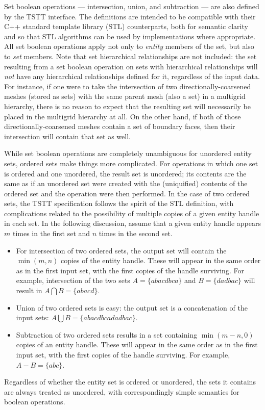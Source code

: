 Set boolean operations --- intersection, union, and subtraction ---
are also defined by the TSTT interface. The definitions are intended
to be compatible with their C++ standard template library (STL) counterparts,
both for semantic clarity and so that STL algorithms can be used by
implementations where appropriate. All set boolean operations apply
not only to \emph{entity} members of the set, but also to \emph{set}
members. Note that set hierarchical relationships are not included:
the set resulting from a set boolean operation on sets with hierarchical
relationships will \emph{not} have any hierarchical relationships
defined for it, regardless of the input data. For instance, if one
were to take the intersection of two directionally-coarsened meshes
(stored as sets) with the same parent mesh (also a set) in a multigrid
hierarchy, there is no reason to expect that the resulting set will
necessarily be placed in the multigrid hierarchy at all. On the other
hand, if both of those directionally-coarsened meshes contain a set
of boundary faces, then their intersection will contain that set as
well.

While set boolean operations are completely unambiguous for unordered
entity sets, ordered sets make things more complicated. For operations
in which one set is ordered and one unordered, the result set is unordered;
its contents are the same as if an unordered set were created with
the (uniquified) contents of the ordered set and the operation were
then performed. In the case of two ordered sets, the TSTT specification
follows the spirit of the STL definition, with complications related
to the possibility of multiple copies of a given entity handle in
each set. In the following discussion, assume that a given entity
handle appears $m$ times in the first set and $n$ times in the second
set. 

\begin{itemize}
\item For intersection of two ordered sets, the output set will contain
the $\min\left(m,n\right)$ copies of the entity handle. These will
appear in the same order as in the first input set, with the first
copies of the handle surviving. For example, intersection of the two
sets $A=\textrm{\{$abacdbca$\}}$ and $B=\{ dadbac\}$ will result
in $A\bigcap B=\{ abacd\}$.
\item Union of two ordered sets is easy: the output set is a concatenation
of the input sets: $A\bigcup B=\{ abacdbcadadbac\}$.
\item Subtraction of two ordered sets results in a set containing $\min\left(m-n,0\right)$
copies of an entity handle. These will appear in the same order as
in the first input set, with the first copies of the handle surviving.
For example, $A-B=\{ abc\}$.
\end{itemize}
Regardless of whether the entity set is ordered or unordered, the
sets it contains are always treated as unordered, with correspondingly
simple semantics for boolean operations.

